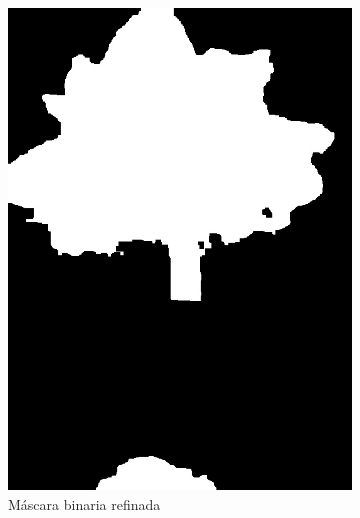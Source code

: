 \begin{figure}[H]
\begin{subfigure}[b]{0.48\textwidth}
    \centering
    \includegraphics[width=\textwidth]{imagenes/clasificador_5_binario_final.jpg}
    \caption{Máscara binaria refinada}
\end{subfigure}
\hfill
\begin{subfigure}[b]{0.48\textwidth}
    \centering

\end{subfigure}
\end{figure}
